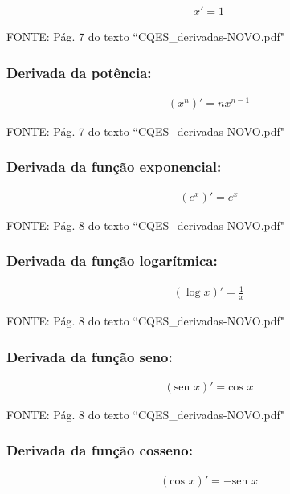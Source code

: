 \documentclass[portuguese,a4paper,12pt,onecolumn,fleqn]{article}
\begin{document}
\begin{gather*}
x' = 1
\end{gather*}

FONTE: Pág. 7 do texto ``CQES\_derivadas-NOVO.pdf"


\subsubsection*{Derivada da potência:}

\begin{gather*}
(x^n)' = n x^{n-1}
\end{gather*}

FONTE: Pág. 7 do texto ``CQES\_derivadas-NOVO.pdf"


\subsubsection*{Derivada da função exponencial:}

\begin{gather*}
(e^x)' = e^x
\end{gather*}

FONTE: Pág. 8 do texto ``CQES\_derivadas-NOVO.pdf"


\subsubsection*{Derivada da função logarítmica:}

\begin{gather*}
(\log x)' = \frac{1}{x}
\end{gather*}

FONTE: Pág. 8 do texto ``CQES\_derivadas-NOVO.pdf"


\subsubsection*{Derivada da função seno:}

\begin{gather*}
(\textrm{sen } x)' = \textrm{cos } x
\end{gather*}

FONTE: Pág. 8 do texto ``CQES\_derivadas-NOVO.pdf"


\subsubsection*{Derivada da função cosseno:}

\begin{gather*}
(\textrm{cos } x)' = - \textrm{sen } x
\end{gather*}
\end{document}

